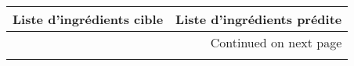\begin{longtable}{p{7cm}p{7cm}}
\toprule
                                                                                                                                                                                                                                                                              Liste d'ingrédients cible &                                                                                                                                                                                                                                                                                                                                                                                                                                             Liste d'ingrédients prédite \\
\midrule
\endhead
\midrule
\multicolumn{2}{r}{{Continued on next page}} \\
\midrule
\endfoot


\end{longtable}
